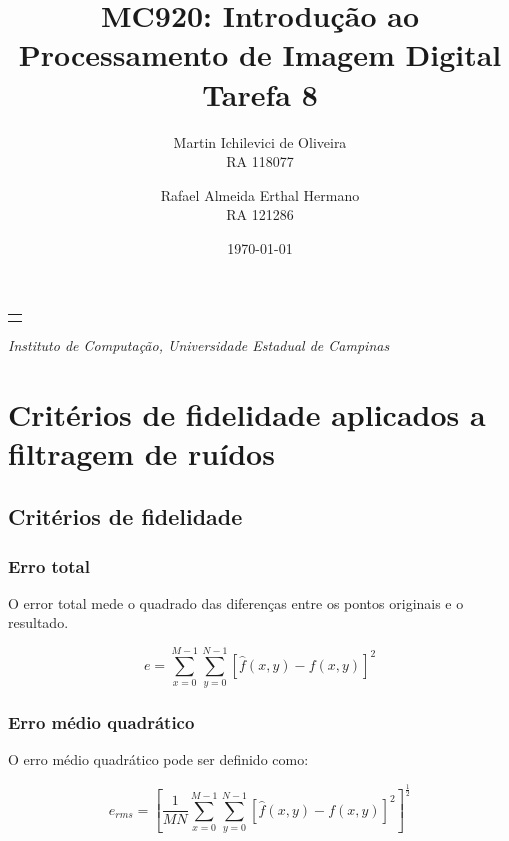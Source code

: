 \documentclass[10pt,a4paper]{article}
\makeatletter
\let\@institution\empty
\def\institution#1{\def\@institution{#1}}
\renewcommand{\maketitle}{
    \begin{center}
        {\Large\bfseries\@title\par\medskip}
        {\large
            \begin{tabular}[t]{c}%
                \@author
        \end{tabular}\par\medskip}
        {\itshape\@institution\par}
        {\itshape\@date\par}
\end{center}}
\makeatother
\begin{document}

\title{MC920: Introdução ao Processamento de Imagem Digital\\Tarefa 8}
\author{
    \begin{minipage}{6cm}
        \centering
        Martin Ichilevici de Oliveira\\
        RA 118077
    \end{minipage}
    \and
    \begin{minipage}{6cm}
        \centering
        Rafael Almeida Erthal Hermano\\
        RA 121286
    \end{minipage}
}
\institution{Instituto de Computação, Universidade Estadual de Campinas}
\date{\today}

\maketitle


\section{Critérios de fidelidade aplicados a filtragem de ruídos}
\subsection{Critérios de fidelidade}
\subsubsection{Erro total}
O error total mede o quadrado das diferenças entre os pontos originais e o resultado.

\begin{equation}
    e = \sum_{x = 0}^{M - 1} \sum_{y = 0}^{N - 1} [\hat{f}(x,y) - f(x,y)]^2
    \label{eq:error}
\end{equation}

\subsubsection{Erro médio quadrático}
O erro médio quadrático pode ser definido como:

\begin{equation}
    e_{rms} = \left[\frac{1}{MN} \sum_{x = 0}^{M - 1} \sum_{y = 0}^{N - 1} [\hat{f}(x,y) - f(x,y)]^2 \right]^{\frac{1}{2}}
    \label{eq:error_rms}
\end{equation}
\end{document}
